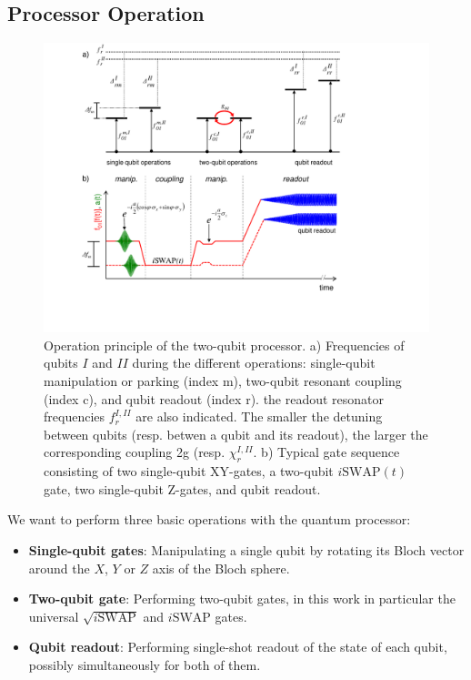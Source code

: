 \subsection{Processor Operation}

\begin{figure}[ht!]
	\centering
	\includegraphics[width=\textwidth]{./material/figures/2-qubit-processor/processor_working_principle}
	\caption[...]{Operation principle of the two-qubit processor. a) Frequencies of qubits $I$ and $II$ during the different operations: single-qubit manipulation or parking (index m), two-qubit resonant coupling (index c), and qubit readout (index r). the readout resonator frequencies $f_r^{I,II}$ are also indicated. The smaller the detuning between qubits (resp. betwen a qubit and its readout), the larger the corresponding coupling 2g  (resp. $\chi_r^{I,II}$. b) Typical gate sequence consisting of two single-qubit XY-gates, a two-qubit $i\mathrm{SWAP}(t)$ gate, two single-qubit Z-gates, and qubit readout.}
	\label{fig:processor_operation}
\end{figure}

We want to perform three basic operations with the quantum processor:

\begin{itemize}
\item \textbf{Single-qubit gates}: Manipulating a single qubit by rotating its Bloch vector around the $X$, $Y$ or $Z$ axis of the Bloch sphere.
\item \textbf{Two-qubit gate}: Performing two-qubit gates, in this work in particular the universal $\sqrt{i\mathrm{SWAP}}$ and $i\mathrm{SWAP}$ gates.
\item \textbf{Qubit readout}: Performing single-shot readout of the state of each qubit, possibly simultaneously for both of them.
\end{itemize}

